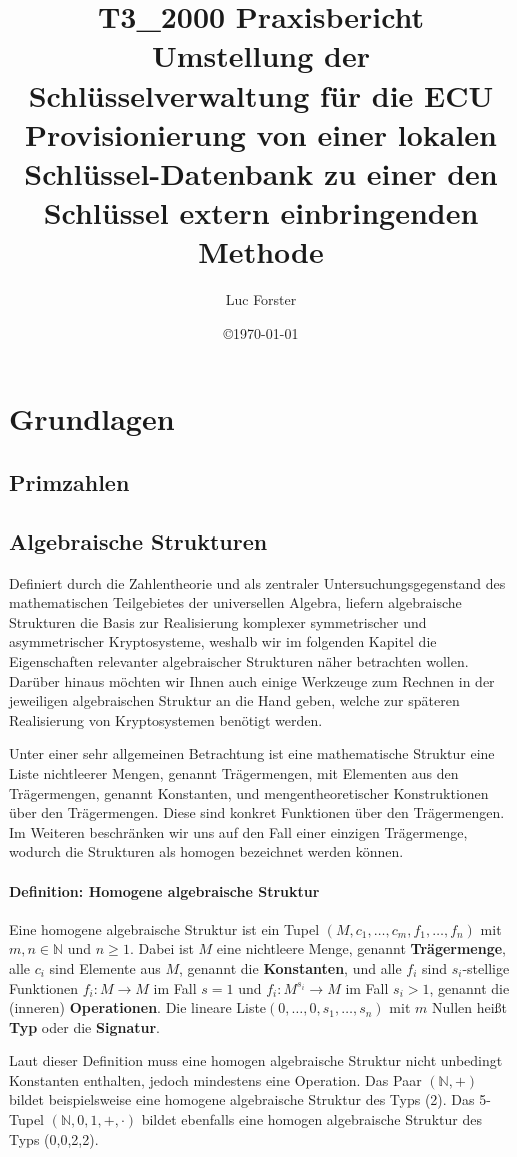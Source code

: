 \documentclass[12pt]{article}							%
\title{T3\_2000 Praxisbericht\\Umstellung der Schlüsselverwaltung für die ECU Provisionierung von einer lokalen Schlüssel-Datenbank zu einer den Schlüssel extern einbringenden Methode} 	%
\author{Luc Forster}									%
\date{\copyright\today}									%
\begin{document}
\section{Grundlagen}
\subsection{Primzahlen}
\subsection{Algebraische Strukturen}
Definiert durch die Zahlentheorie und als zentraler Untersuchungsgegenstand des mathematischen Teilgebietes der universellen Algebra, liefern algebraische Strukturen die Basis zur Realisierung komplexer symmetrischer und asymmetrischer Kryptosysteme, weshalb wir im folgenden Kapitel die Eigenschaften relevanter algebraischer Strukturen näher betrachten wollen. Darüber hinaus möchten wir Ihnen auch einige Werkzeuge zum Rechnen in der jeweiligen algebraischen Struktur an die Hand geben, welche zur späteren Realisierung von Kryptosystemen benötigt werden.

Unter einer sehr allgemeinen Betrachtung ist eine mathematische Struktur eine Liste nichtleerer Mengen, genannt Trägermengen, mit Elementen aus den Trägermengen, genannt Konstanten, und mengentheoretischer Konstruktionen über den Trägermengen. Diese sind konkret Funktionen über den Trägermengen.
Im Weiteren beschränken wir uns auf den Fall einer einzigen Trägermenge, wodurch die Strukturen als homogen bezeichnet werden können.
\paragraph{Definition: Homogene algebraische Struktur}
Eine homogene algebraische Struktur ist ein Tupel $(M,c_1,\dots,c_m,f_1,\dots,f_n)$ mit $m,n \in \mathbb{N}$ und $n \geq 1$. Dabei ist $M$ eine nichtleere Menge, genannt \textbf{Trägermenge}, alle $c_i$ sind Elemente aus $M$, genannt die \textbf{Konstanten}, und alle $f_i$ sind $s_i$-stellige Funktionen $f_i:M \rightarrow M$ im Fall $s = 1$ und $f_i:M^{s_i} \rightarrow M$ im Fall $s_i>1$, genannt die (inneren) \textbf{Operationen}. Die lineare Liste$(0,\dots,0,s_1,\dots,s_n)$ mit $m$ Nullen heißt \textbf{Typ} oder die \textbf{Signatur}.\newline

Laut dieser Definition muss eine homogen algebraische Struktur nicht unbedingt Konstanten enthalten, jedoch mindestens eine Operation. Das Paar $(\mathbb{N},+)$ bildet beispielsweise eine homogene algebraische Struktur des Typs (2). Das 5-Tupel $(\mathbb{N},0,1,+,\cdot)$ bildet ebenfalls eine homogen algebraische Struktur des Typs (0,0,2,2).
\end{document}
